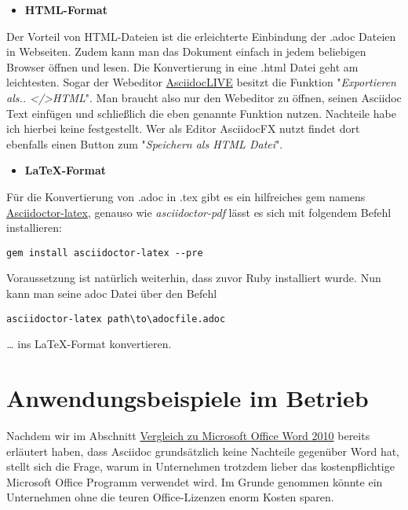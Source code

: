 \documentclass[11pt]{amsbook}
\begin{document}
\begin{itemize}

\item \textbf{HTML-Format}

\end{itemize}


Der Vorteil von HTML-Dateien ist die erleichterte Einbindung der .adoc Dateien in Webseiten. Zudem kann man das Dokument einfach in jedem beliebigen Browser öffnen und lesen. Die Konvertierung in eine .html Datei geht am leichtesten. Sogar der Webeditor  \href{https://asciidoclive.com/edit/scratch/1}{AsciidocLIVE} besitzt die Funktion "\emph{Exportieren als.. </>HTML}". Man braucht also nur den Webeditor zu öffnen, seinen Asciidoc Text einfügen und schließlich die eben genannte Funktion nutzen. Nachteile habe ich hierbei keine festgestellt.
Wer als Editor AsciidocFX nutzt findet dort ebenfalls einen Button zum "\emph{Speichern als HTML Datei}".


\begin{itemize}

\item \textbf{LaTeX-Format}

\end{itemize}


Für die Konvertierung von .adoc in .tex gibt es ein hilfreiches gem namens \href{https://github.com/asciidoctor/asciidoctor-latex}{Asciidoctor-latex}, genauso wie \emph{asciidoctor-pdf} lässt es sich mit folgendem Befehl installieren:


\begin{verbatim}
gem install asciidoctor-latex --pre
\end{verbatim}

Voraussetzung ist natürlich weiterhin, dass zuvor Ruby installiert wurde. Nun kann man seine adoc Datei über den Befehl


\begin{verbatim}
asciidoctor-latex path\to\adocfile.adoc
\end{verbatim}

\emph{…​} ins LaTeX-Format konvertieren.


\hypertarget{x-anwendungsbeispiele-im-betrieb}{\chapter*{Anwendungsbeispiele im Betrieb}}
Nachdem wir im Abschnitt \hyperlink{x-vergleich-zu-microsoft-office-word-2010}{Vergleich zu Microsoft Office Word 2010} bereits erläutert haben, dass Asciidoc grundsätzlich keine Nachteile gegenüber Word hat, stellt sich die Frage, warum in Unternehmen trotzdem lieber das kostenpflichtige Microsoft Office Programm verwendet wird. Im Grunde genommen könnte ein Unternehmen ohne die teuren Office-Lizenzen enorm Kosten sparen.
\end{document}
